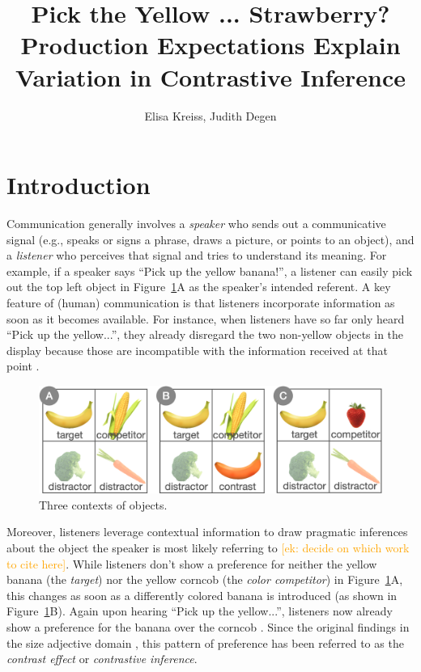 \documentclass[a4paper,man,floatsintext,natbib]{apa6}
\title{\large Pick the Yellow ... Strawberry? Production Expectations Explain Variation in Contrastive Inference}
\author{Elisa Kreiss, Judith Degen}
\affiliation{Stanford University}
\newcommand{\ek}[1]{\textcolor{Orange}{[ek: #1]}}
\newcommand{\figref}[1]{Figure~\ref{#1}}
\begin{document}
\maketitle


\section{Introduction}\label{sec:intro}





Communication generally involves a \emph{speaker} who sends out a communicative signal (e.g., speaks or signs a phrase, draws a picture, or points to an object), and a \emph{listener} who perceives that signal and tries to understand its meaning. For example, if a speaker says ``Pick up the yellow banana!'', a listener can easily pick out the top left object in \figref{example-contexts}A as the speaker's intended referent. 
A key feature of (human) communication is that listeners incorporate information as soon as it becomes available. For instance, when listeners have so far only heard ``Pick up the yellow...'', they already disregard the two non-yellow objects in the display because those are incompatible with the information received at that point \citep{Tanenhaus:1995,Sedivy:1999}. 

\begin{figure}
	\begin{center}
		\includegraphics[width=.8\textwidth]{img/example-contexts.png}
	\end{center}
\caption{Three contexts of objects.} 
\label{example-contexts}
\end{figure}

Moreover, listeners leverage contextual information to draw pragmatic inferences about the object the speaker is most likely referring to \ek{decide on which work to cite here}. While listeners don't show a preference for neither the yellow banana (the \emph{target}) nor the yellow corncob (the \emph{color competitor}) in \figref{example-contexts}A, this changes as soon as a differently colored banana is introduced (as shown in \figref{example-contexts}B). Again upon hearing ``Pick up the yellow...'', listeners now already show a preference for the banana over the corncob \citep{Sedivy:1999,Sedivy:2003,Aparicio:2016,Rubio-Fernandez:2019}. Since the original findings in the size adjective domain \citep{Sedivy:1999}, this pattern of preference has been referred to as the \emph{contrast effect} or \emph{contrastive inference}.
\end{document}
